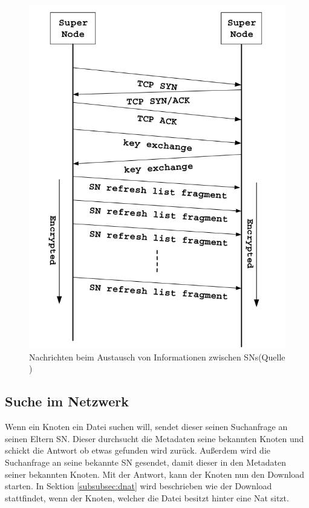 \begin{figure}
\includegraphics[scale=0.3]{gfx/SnToSn}
\caption{Nachrichten beim Austausch von Informationen zwischen SNs(Quelle \cite{liang2006fasttrack})}
\label{fig:snsn}
\end{figure}

\subsection{Suche im Netzwerk}
\label{subsec:search}

Wenn ein Knoten ein Datei suchen will, sendet dieser seinen Suchanfrage an seinen Eltern SN.
Dieser durchsucht die Metadaten seine bekannten Knoten und schickt die Antwort ob etwas gefunden wird zurück.
Außerdem wird die Suchanfrage an seine bekannte SN gesendet, damit dieser in den Metadaten seiner bekannten Knoten.
Mit der Antwort, kann der Knoten nun den Download starten.
In Sektion \ref{subsubsec:dnat} wird beschrieben wie der Download stattfindet, wenn der Knoten, welcher die Datei besitzt hinter eine Nat sitzt.

